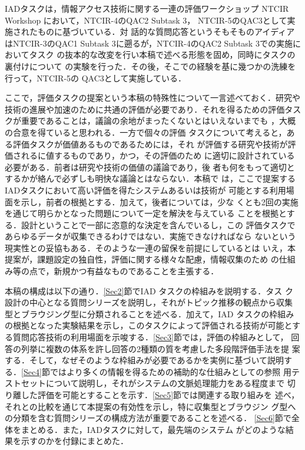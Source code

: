 \documentclass[japanese]{jnlp_1.4}
\begin{document}
IADタスクは，情報アクセス技術に関する一連の評価ワークショップ NTCIR
Workshop \cite{NTCIR}において，NTCIR-4のQAC2 Subtask 3\cite{Kato04,Kato05a}，
NTCIR-5のQAC3\cite{Kato05b,KatoJ06}として実施されたものに基づいている．対
話的な質問応答というそもそものアイディアはNTCIR-3のQAC1 Subtask
3\cite{Fukumoto03}に遡るが，NTCIR-4のQAC2 Subtask 3での実施においてタスク
の抜本的な改変を行い本稿で述べる形態を固め，同時にタスクの裏付けについて
の実験を行った．その後，そこでの経験を基に幾つかの洗練を行って，NTCIR-5の
QAC3として実施している．

ここで，評価タスクの提案という本稿の特殊性について一言述べておく．研究や
技術の進展や加速のために共通の評価が必要であり．それを得るための評価タス
クが重要であることは，議論の余地がまったくないとはいえないまでも
\cite{Sekine05}，大概の合意を得ていると思われる\cite{Ogawa02}．一方で個々の評価
タスクについて考えると，ある評価タスクが価値あるものであるためには，それ
が評価する研究や技術が評価されるに値するものであり，かつ，その評価のため
に適切に設計されている必要がある．前者は研究や技術の価値の議論であり，後
者も何をもって適切とするかが絡んで必ずしも明快な議論とはならない．本稿で
は，ここで提案するIADタスクにおいて高い評価を得たシステムあるいは技術が
可能とする利用場面を示し，前者の根拠とする．加えて，後者については，少な
くとも2回の実施を通じて明らかとなった問題について一定を解決を与えている
ことを根拠とする．設計ということで一部に恣意的な決定を含んでいるし，この
評価タスクであらゆるデータが収集できるわけではない．実施できなければなら
ないという現実性との妥協もある．そのような一連の留保を前提にしているとは
いえ，本提案が，課題設定の独自性，評価に関する様々な配慮，情報収集のため
の仕組み等の点で，新規かつ有益なものであることを主張する．

本稿の構成は以下の通り．\ref{Sec2}節でIAD タスクの枠組みを説明する．タス
ク設計の中心となる質問シリーズを説明し，それがトピック推移の観点から収集
型とブラウジング型に分類されることを述べる．加えて，IAD タスクの枠組み
の根拠となった実験結果を示し，このタスクによって評価される技術が可能とす
る質問応答技術の利用場面を示唆する．\ref{Sec3}節では，評価の枠組みとして，
回答の列挙に複数の体系を許し回答の2種類の質を考慮した多段階評価手法を提
案する．そして，なぜそのような枠組みが必要であるかを実例に基づいて説明す
る．\ref{Sec4}節ではより多くの情報を得るための補助的な仕組みとしての参照
用テストセットについて説明し，それがシステムの文脈処理能力をある程度まで
切り離した評価を可能とすることを示す．\ref{Sec5}節では関連する取り組みを
述べ，それとの比較を通じて本提案の有効性を示し，特に収集型とブラウジン
グ型への分類を含む質問シリーズの構成方法が重要であることを述べる．
\ref{Sec6}節で全体をまとめる．また，IADタスクに対して，最先端のシステム
がどのような結果を示すのかを付録にまとめた．
\end{document}
